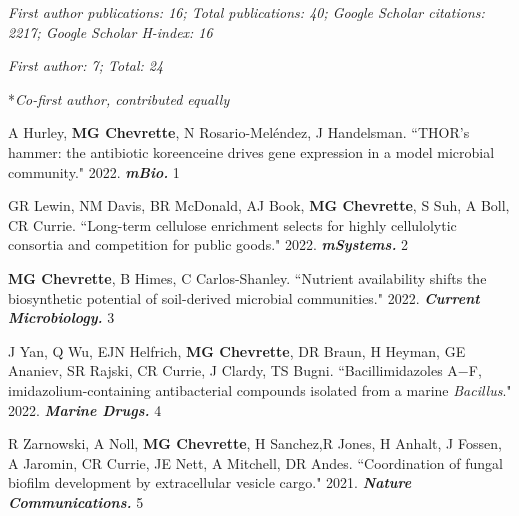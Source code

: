 

\textit{First author publications: 16; Total publications: 40; Google Scholar citations: 2217; Google Scholar H-index: 16}

 \vspace{-2mm}

\begin{cvpubs}

\cvpub
{\hspace{-1cm} \textit{First author: 7; Total: 24}}
{}

\cvpub
{\hspace{-1cm} *\textit{Co-first author, contributed equally}} %
{}

\cvpub
{A Hurley, \textbf{MG Chevrette}, N Rosario-Mel\'{e}ndez, J Handelsman. ``THOR's hammer: the antibiotic koreenceine drives gene expression in a model microbial community." 2022. \textit{\textbf{mBio.}} \textit{\textbf{}}}
{1}

\cvpub
{GR Lewin, NM Davis, BR McDonald, AJ Book, \textbf{MG Chevrette}, S Suh, A Boll, CR Currie. ``Long-term cellulose enrichment selects for highly cellulolytic consortia and competition for public goods." 2022. \textit{\textbf{mSystems.}} \textit{\textbf{}}}
{2}

\cvpub
{\textbf{MG Chevrette}, B Himes, C Carlos-Shanley. ``Nutrient availability shifts the biosynthetic potential of soil-derived microbial communities." 2022. \textit{\textbf{Current Microbiology.}} \textit{\textbf{}}}
{3}

\cvpub
{J Yan, Q Wu, EJN Helfrich, \textbf{MG Chevrette}, DR Braun, H Heyman,  GE Ananiev, SR Rajski, CR Currie, J Clardy, TS Bugni. ``Bacillimidazoles A−F, imidazolium-containing antibacterial compounds isolated from a marine \textit{Bacillus}." 2022. \textit{\textbf{Marine Drugs.}} \textit{\textbf{}}}
{4}

\cvpub
{R Zarnowski, A Noll, \textbf{MG Chevrette}, H Sanchez,R Jones, H Anhalt, J Fossen, A Jaromin, CR Currie, JE Nett, A Mitchell, DR Andes. ``Coordination of fungal biofilm development by extracellular vesicle cargo." 2021. \textit{\textbf{Nature Communications.}} \textit{\textbf{}}}
{5}


\end{cvpubs}
